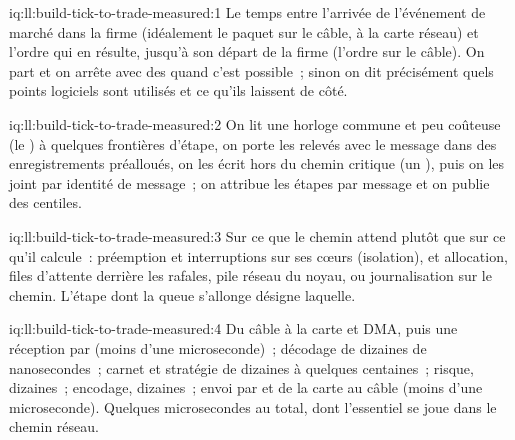 \begin{solution}{iq:ll:build-tick-to-trade-measured:1}
Le temps entre l'arrivée de l'événement de marché dans la firme (idéalement le paquet sur le câble, à la carte réseau) et
l'ordre qui en résulte, jusqu'à son départ de la firme (l'ordre sur le câble). On part et on arrête avec des  quand c'est possible~; sinon on dit précisément quels
points logiciels sont utilisés et ce qu'ils laissent de côté.
\end{solution}

\begin{solution}{iq:ll:build-tick-to-trade-measured:2}
On lit une horloge commune et peu coûteuse (le ) à quelques frontières d'étape, on porte les relevés avec le message dans
des enregistrements préalloués, on les écrit hors du chemin critique (un ), puis on les joint par identité de message~; on attribue les étapes par message
et on publie des centiles.
\end{solution}

\begin{solution}{iq:ll:build-tick-to-trade-measured:3}
Sur ce que le chemin attend plutôt que sur ce qu'il calcule~: préemption et interruptions sur ses cœurs (isolation),  et
allocation, files d'attente derrière les rafales, pile réseau du noyau,  ou journalisation sur le chemin. L'étape dont la
queue s'allonge désigne laquelle.
\end{solution}

\begin{solution}{iq:ll:build-tick-to-trade-measured:4}
Du câble à la carte et DMA, puis une réception par  (moins d'une microseconde)~; décodage de dizaines de nanosecondes~; carnet et stratégie de dizaines à
quelques centaines~; risque, dizaines~; encodage, dizaines~; envoi par  et de la carte au câble (moins d'une microseconde). Quelques microsecondes au total, dont l'essentiel
se joue dans le chemin réseau.
\end{solution}

